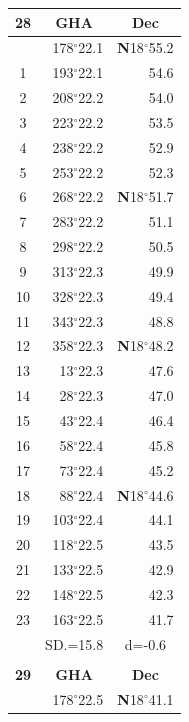 \documentclass[10pt, a4paper]{report}
\begin{document}
\begin{scriptsize}
\begin{tabular*}{0.2\textwidth}[t]{@{\extracolsep{\fill}}|c|rr|}
\hline
\multicolumn{1}{|c|}{\rule{0pt}{2.6ex}\textbf{28}} & \multicolumn{1}{c}{\textbf{GHA}} & \multicolumn{1}{c|}{\textbf{Dec}}\\
\hline\rule{0pt}{2.6ex}\noindent
0 & 178$^\circ$22.1 & \textbf{N}18$^\circ$55.2\\
1 & 193$^\circ$22.1 & 54.6\\
2 & 208$^\circ$22.2 & 54.0\\
3 & 223$^\circ$22.2 & \raisebox{0.24ex}{\boldmath$\cdot$~\boldmath$\cdot$~~}53.5\\
4 & 238$^\circ$22.2 & 52.9\\
5 & 253$^\circ$22.2 & 52.3\\[2Pt]
6 & 268$^\circ$22.2 & \textbf{N}18$^\circ$51.7\\
7 & 283$^\circ$22.2 & 51.1\\
8 & 298$^\circ$22.2 & 50.5\\
9 & 313$^\circ$22.3 & \raisebox{0.24ex}{\boldmath$\cdot$~\boldmath$\cdot$~~}49.9\\
10 & 328$^\circ$22.3 & 49.4\\
11 & 343$^\circ$22.3 & 48.8\\[2Pt]
12 & 358$^\circ$22.3 & \textbf{N}18$^\circ$48.2\\
13 & 13$^\circ$22.3 & 47.6\\
14 & 28$^\circ$22.3 & 47.0\\
15 & 43$^\circ$22.4 & \raisebox{0.24ex}{\boldmath$\cdot$~\boldmath$\cdot$~~}46.4\\
16 & 58$^\circ$22.4 & 45.8\\
17 & 73$^\circ$22.4 & 45.2\\[2Pt]
18 & 88$^\circ$22.4 & \textbf{N}18$^\circ$44.6\\
19 & 103$^\circ$22.4 & 44.1\\
20 & 118$^\circ$22.5 & 43.5\\
21 & 133$^\circ$22.5 & \raisebox{0.24ex}{\boldmath$\cdot$~\boldmath$\cdot$~~}42.9\\
22 & 148$^\circ$22.5 & 42.3\\
23 & 163$^\circ$22.5 & 41.7\\
\hline
\rule{0pt}{2.4ex} & \multicolumn{1}{c}{SD.=15.8} & \multicolumn{1}{c|}{d=-0.6}\\
\hline
\multicolumn{1}{c}{}\\[-0.5ex]\hline
\multicolumn{1}{|c|}{\rule{0pt}{2.6ex}\textbf{29}} & \multicolumn{1}{c}{\textbf{GHA}} & \multicolumn{1}{c|}{\textbf{Dec}}\\
\hline\rule{0pt}{2.6ex}\noindent
0 & 178$^\circ$22.5 & \textbf{N}18$^\circ$41.1\\

\end{tabular*}
\end{scriptsize}
\end{document}
